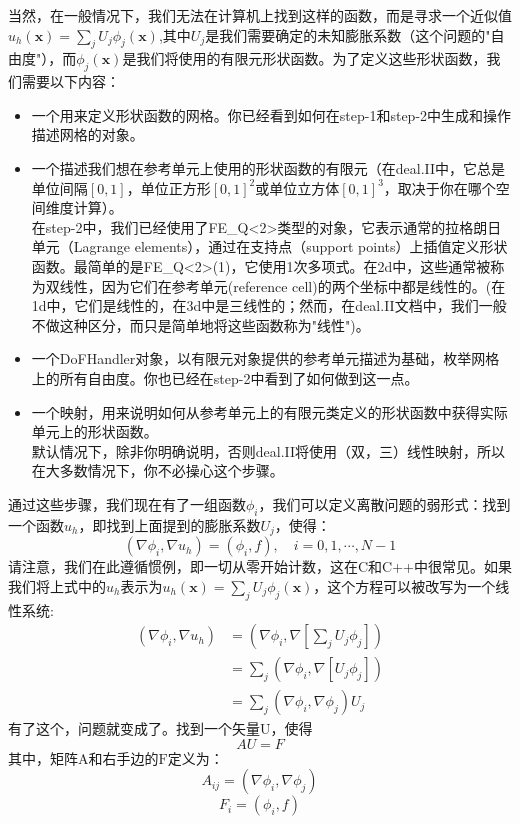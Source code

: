 \documentclass[nofonts]{ctexart} %
\begin{document}
当然，在一般情况下，我们无法在计算机上找到这样的函数，而是寻求一个近似值$u_h(\mathbf{x})=\sum_jU_j\phi_j(\mathbf{x})$,其中$U_{j}$是我们需要确定的未知膨胀系数（这个问题的"自由度"），而$\phi_{j}(\mathbf{x})$是我们将使用的有限元形状函数。为了定义这些形状函数，我们需要以下内容：\\
  \begin{itemize}
    \item 一个用来定义形状函数的网格。你已经看到如何在step-1和step-2中生成和操作描述网格的对象。
    \item 一个描述我们想在参考单元上使用的形状函数的有限元（在deal.II中，它总是单位间隔$[0,1]$，单位正方形$[0,1]^{2}$或单位立方体$[0,1]^{3}$，取决于你在哪个空间维度计算）。\\
在step-2中，我们已经使用了FE\_Q<2>类型的对象，它表示通常的拉格朗日单元（Lagrange elements），通过在支持点（support points）上插值定义形状函数。最简单的是FE\_Q<2>(1)，它使用1次多项式。在2d中，这些通常被称为双线性，因为它们在参考单元(reference cell)的两个坐标中都是线性的。(在1d中，它们是线性的，在3d中是三线性的；然而，在deal.II文档中，我们一般不做这种区分，而只是简单地将这些函数称为"线性")。
    \item 一个DoFHandler对象，以有限元对象提供的参考单元描述为基础，枚举网格上的所有自由度。你也已经在step-2中看到了如何做到这一点。
    \item 一个映射，用来说明如何从参考单元上的有限元类定义的形状函数中获得实际单元上的形状函数。\\
  默认情况下，除非你明确说明，否则deal.II将使用（双，三）线性映射，所以在大多数情况下，你不必操心这个步骤。
  \end{itemize}
通过这些步骤，我们现在有了一组函数$\phi_{i}$，我们可以定义离散问题的弱形式：找到一个函数$u_{h}$，即找到上面提到的膨胀系数$U_{j}$，使得：
\begin{equation}
  (\nabla\phi_i,\nabla u_h)=(\phi_i,f),\quad i=0,1,\cdots,N-1
\end{equation}
请注意，我们在此遵循惯例，即一切从零开始计数，这在C和C++中很常见。如果我们将上式中的$u_{h}$表示为$u_h(\mathbf{x})=\sum_jU_j\phi_j(\mathbf{x})$，这个方程可以被改写为一个线性系统:
\begin{equation}
  \begin{aligned}
(\nabla\phi_i,\nabla u_h)& =\left(\nabla\phi_i,\nabla\left[\sum_jU_j\phi_j\right]\right)  \\
&=\sum_j(\nabla\phi_i,\nabla[U_j\phi_j]) \\
&=\sum_j(\nabla\phi_i,\nabla\phi_j)U_j
  \end{aligned}
\end{equation}
有了这个，问题就变成了。找到一个矢量$\text{U}$，使得
\begin{equation}
  AU=F
\end{equation}
其中，矩阵$\text{A}$和右手边的$\text{F}$定义为：
\begin{equation}
  A_{ij}=(\nabla\phi_i,\nabla\phi_j)
\end{equation}
\begin{equation}
  F_i=(\phi_i,f)
\end{equation} 
\end{document}
